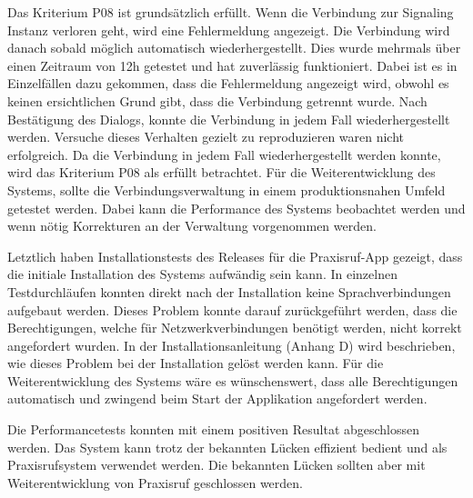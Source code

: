 Das Kriterium P08 ist grundsätzlich erfüllt.
Wenn die Verbindung zur Signaling Instanz verloren geht, wird eine Fehlermeldung angezeigt.
Die Verbindung wird danach sobald möglich automatisch wiederhergestellt.
Dies wurde mehrmals über einen Zeitraum von 12h getestet und hat zuverlässig funktioniert.
Dabei ist es in Einzelfällen dazu gekommen, dass die Fehlermeldung angezeigt wird, obwohl es keinen ersichtlichen Grund gibt, dass die Verbindung getrennt wurde.
Nach Bestätigung des Dialogs, konnte die Verbindung in jedem Fall wiederhergestellt werden.
Versuche dieses Verhalten gezielt zu reproduzieren waren nicht erfolgreich.
Da die Verbindung in jedem Fall wiederhergestellt werden konnte, wird das Kriterium P08 als erfüllt betrachtet.
Für die Weiterentwicklung des Systems, sollte die Verbindungsverwaltung in einem produktionsnahen Umfeld getestet werden.
Dabei kann die Performance des Systems beobachtet werden und wenn nötig Korrekturen an der Verwaltung vorgenommen werden.

Letztlich haben Installationstests des Releases für die Praxisruf-App gezeigt, dass die initiale Installation des Systems aufwändig sein kann.
In einzelnen Testdurchläufen konnten direkt nach der Installation keine Sprachverbindungen aufgebaut werden.
Dieses Problem konnte darauf zurückgeführt werden, dass die Berechtigungen, welche für Netzwerkverbindungen benötigt werden, nicht korrekt angefordert wurden.
In der Installationsanleitung (Anhang D) wird beschrieben, wie dieses Problem bei der Installation gelöst werden kann.
Für die Weiterentwicklung des Systems wäre es wünschenswert, dass alle Berechtigungen automatisch und zwingend beim Start der Applikation angefordert werden.

Die Performancetests konnten mit einem positiven Resultat abgeschlossen werden.
Das System kann trotz der bekannten Lücken effizient bedient und als Praxisrufsystem verwendet werden.
Die bekannten Lücken sollten aber mit Weiterentwicklung von Praxisruf geschlossen werden.

\clearpage
